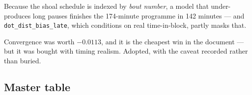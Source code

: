 \documentclass[11pt,a4paper]{article}
\newcommand{\code}[1]{\texttt{\small #1}}
\begin{document}
Because the shoal schedule is indexed by \emph{bout number}, a model that under-produces
long pauses finishes the 174-minute programme in 142 minutes --- and
\code{dot\_dist\_bias\_late}, which conditions on real time-in-block, partly masks that.

\begin{takeaway}
Convergence was worth $-0.0113$, and it is the cheapest win in the document --- but it was
bought with timing realism. Adopted, with the caveat recorded rather than buried.
\end{takeaway}

\subsection{Master table}
\end{document}
